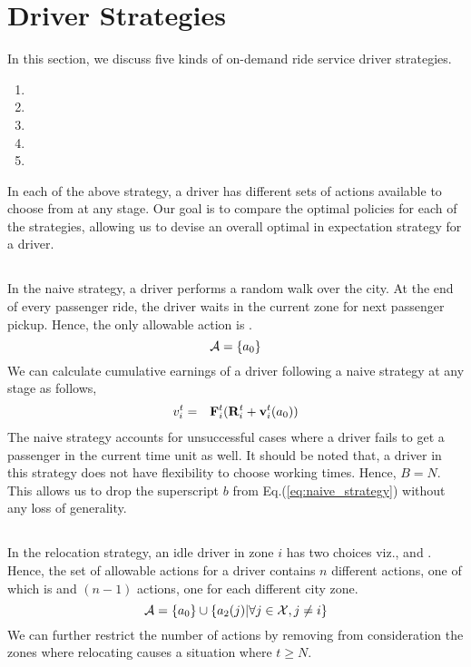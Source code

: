 
\section{Driver Strategies}
\label{sec:driver_strategies}

In this section, we discuss five kinds of on-demand ride service
driver strategies.
\begin{enumerate}
    \item {\naive} 
    \item {\relocation} 
    \item {\flexible} 
    \item {\relocationflexible}
    \item {\earningsgoal}
\end{enumerate}

In each of the above strategy, a driver has different sets of actions available to choose from at any stage. Our goal is to compare the optimal policies for each of the strategies, allowing us to devise an overall optimal in expectation strategy for a driver.

\subsection{\naive}
In the naive strategy, a driver performs a random walk over the city. At the end of every passenger ride, the driver waits in the current zone for next passenger pickup. Hence, the only allowable action is {\getpassenger}.
\begin{equation}
\mathcal{A} = \{a_0\}
\end{equation}
We can calculate cumulative earnings of a driver following a naive strategy at any stage as follows,
\begin{eqnarray}
\label{eq:naive_strategy}
v_{i}^{t} &=& {\mathbf{F}}_{i}^{t} ({\mathbf{R}}_{i}^{t} +  \mathbf{v}_{i}^{t}({a_0}))
\end{eqnarray}
The naive strategy accounts for unsuccessful cases where a driver fails to get a passenger in the current time unit as well. It should be noted that, a driver in this strategy does not have flexibility to choose working times. Hence, $B=N$. This allows us to drop the superscript $b$ from Eq.(\ref{eq:naive_strategy}) without any loss of generality.

\subsection{\relocation}
In the relocation strategy, an idle driver in zone $i$ has two choices viz., {\getpassenger} and {\relocate}. Hence, the set of allowable actions for a driver contains $n$ different actions, one of which is {\getpassenger} and $(n-1)$ {\relocate} actions, one for each different city zone. 
\begin{equation}
\mathcal{A} =  \{a_0\} \cup \{a_2(j) | \forall j \in \mathcal{X}, j \neq i \}
\end{equation}
We can further restrict the number of {\relocate} actions by removing from consideration the zones where relocating causes a situation where $t \geq N$.

